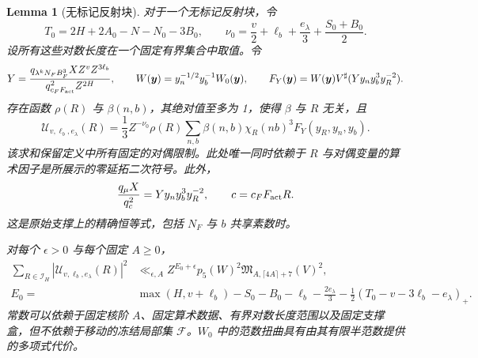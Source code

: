 \documentclass[11pt,a4paper]{article}
\numberwithin{equation}{section}
\numberwithin{figure}{section}
\newtheorem{lemma}[theorem]{Lemma}
\theoremstyle{definition}
\theoremstyle{remark}
\begin{document}
\begin{lemma}[无标记反射块]
\label{lem:unmarked-reflected-block}
对于一个无标记反射块，令
\[
 T_0=2H+2A_0-N-N_0-3B_0,\qquad
 \nu_0=\frac v2+\ell_b+\frac{e_\lambda}{3}+\frac{S_0+B_0}{2}.
\]
设所有这些对数长度在一个固定有界集合中取值。令
\[
 Y=\frac{q_{\lambda^kN_FB_F^3}X Z^vZ^{3\ell_b}}
          {q_{c_FF_{\rm act}}^2Z^{2H}},\qquad
 W(\boldsymbol y)=y_n^{-1/2}y_b^{-1}W_0(\boldsymbol y),\qquad
 F_Y(\boldsymbol y)=W(\boldsymbol y)V^\sharp(Yy_ny_b^3y_R^{-2}).
\]
存在函数 $\rho(R)$ 与 $\beta(n,b)$，其绝对值至多为 1，使得 $\beta$ 与 $R$ 无关，且
\begin{equation}\label{eq:unmarked-structural-block}
 \mathcal U_{v,\ell_b,e_\lambda}(R)
 =\frac13 Z^{-\nu_0}\rho(R)
       \sum_{n,b}\beta(n,b)\chi_R(nb)^3F_Y(y_R,y_n,y_b).
\end{equation}
该求和保留定义中所有固定的对偶限制。此处唯一同时依赖于 $R$ 与对偶变量的算术因子是所展示的零延拓二次符号。此外，
\begin{equation}\label{eq:unmarked-actual-annuli}
 \frac{q_\mu X}{q_c^2}=Yy_ny_b^3y_R^{-2},\qquad
 c=c_FF_{\rm act}R.
\end{equation}
这是原始支撑上的精确恒等式，包括 $N_F$ 与 $b$ 共享素数时。

对每个 $\epsilon>0$ 与每个固定 $A\ge0$，
\begin{equation}\label{eq:unmarked-reflected-energy}
 \begin{split}
 \sum_{R\in\mathcal I_H}|\mathcal U_{v,\ell_b,e_\lambda}(R)|^2
 &\ll_{\epsilon,A} Z^{E_0+\epsilon}p_5(W)^2
       \mathfrak M_{A,\lceil4A\rceil+7}(V)^2,\\
 E_0={}&\max(H,v+\ell_b)-S_0-B_0-\ell_b-\frac{2e_\lambda}{3}
       -\frac12(T_0-v-3\ell_b-e_\lambda)_+.
 \end{split}
\end{equation}
常数可以依赖于固定核阶 $A$、固定算术数据、有界对数长度范围以及固定支撑盒，但不依赖于移动的冻结局部集 $\mathcal F$。$W_0$ 中的范数扭曲具有由其有限半范数提供的多项式代价。
\end{lemma}
\end{document}
